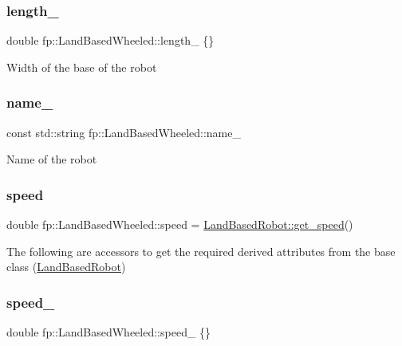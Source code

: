 \subsubsection{\texorpdfstring{length\+\_\+}{length\_}}
{\footnotesize\ttfamily double fp\+::\+Land\+Based\+Wheeled\+::length\+\_\+ \{\}\hspace{0.3cm}{\ttfamily [protected]}}

Width of the base of the robot \mbox{\label{classfp_1_1_land_based_wheeled_a72094d60b6dbfa33b6e5cab4a8e5f7c4}} 
\subsubsection{\texorpdfstring{name\+\_\+}{name\_}}
{\footnotesize\ttfamily const std\+::string fp\+::\+Land\+Based\+Wheeled\+::name\+\_\+\hspace{0.3cm}{\ttfamily [protected]}}

Name of the robot \mbox{\label{classfp_1_1_land_based_wheeled_aaab6e766362d75c7e52a183256123a36}} 
\subsubsection{\texorpdfstring{speed}{speed}}
{\footnotesize\ttfamily double fp\+::\+Land\+Based\+Wheeled\+::speed = \hyperlink{classfp_1_1_land_based_robot_a44fed3a00505f6679ff8505aebae4505}{Land\+Based\+Robot\+::get\+\_\+speed}()}

The following are accessors to get the required derived attributes from the base class (\hyperlink{classfp_1_1_land_based_robot}{Land\+Based\+Robot}) \mbox{\label{classfp_1_1_land_based_wheeled_a65bfb90a4e7fe10c87f30d276d9db80c}} 
\subsubsection{\texorpdfstring{speed\+\_\+}{speed\_}}
{\footnotesize\ttfamily double fp\+::\+Land\+Based\+Wheeled\+::speed\+\_\+ \{\}\hspace{0.3cm}{\ttfamily [protected]}}

